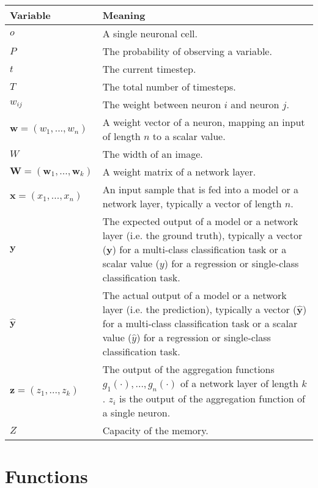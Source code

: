  \begin{tabular}{ p{3cm} p{11cm} }
	\textbf{Variable} & \textbf{Meaning}\\
	\hline
    $o$ & A single neuronal cell.\\
    $P$ & The probability of observing a variable.\\
    $t$ & The current timestep.\\
     $T$ & The total number of timesteps.\\
    $w_{ij}$ & The weight between neuron $i$ and neuron $j$.\\
	$\boldsymbol{w} = (w_1, ..., w_n)$ & A weight vector of a neuron, mapping an input of length $n$ to a scalar value.\\
    $W$ & The width of an image.\\
	$\boldsymbol{W} = (\boldsymbol{w}_1, ..., \boldsymbol{w}_k)$ & A weight matrix of a network layer.\\
    $\boldsymbol{x} = (x_1, ..., x_n)$ & An input sample that is fed into a model or a network layer, typically a vector of length $n$.\\
     $\boldsymbol{y}$ & The expected output of a model or a network layer (i.e. the ground truth), typically a vector ($\boldsymbol{y}$) for a multi-class classification task or a scalar value ($y$) for a regression or single-class classification task.\\
 	$\boldsymbol{\hat{y}}$ & The actual output of a model or a network layer (i.e. the prediction), typically a vector ($\boldsymbol{\hat{y}}$) for a multi-class classification task or a scalar value ($\hat{y}$) for a regression or single-class classification task.\\
	$\boldsymbol{z} = (z_1, ..., z_k)$ & The output of the aggregation functions $g_1(\cdot), ..., g_n(\cdot)$ of a network layer of length $k$. $z_i$  is the output of the aggregation function of a single neuron.\\
    $Z$ & Capacity of the memory.\\
\end{tabular}


\section{Functions}

